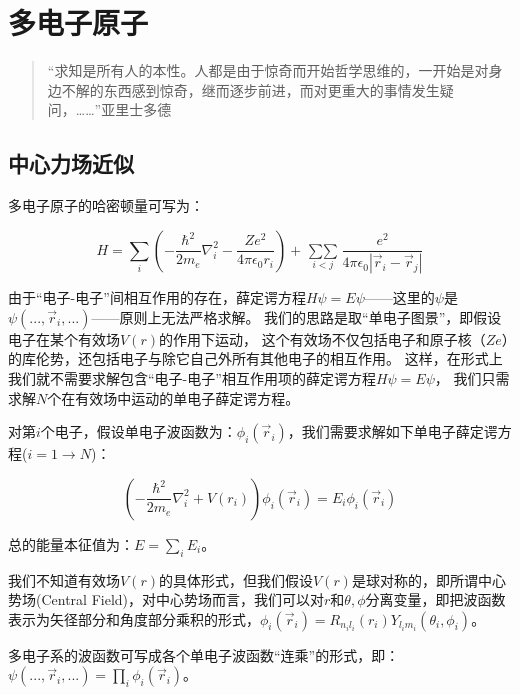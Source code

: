 \section{多电子原子}

\begin{quotation}
“求知是所有人的本性。人都是由于惊奇而开始哲学思维的，一开始是对身边不解的东西感到惊奇，继而逐步前进，而对更重大的事情发生疑问，……”\qquad 亚里士多德
\end{quotation}

\subsection{中心力场近似}

多电子原子的哈密顿量可写为：

\begin{equation}\label{Many electrons atom}
H = \sum\limits_i {\left( { - \frac{{\hbar ^2 }} {{2m_e }}\nabla
_i^2  - \frac{{Ze^2 }} {{4\pi \epsilon _0 r_i }}} \right) + \mathop
{\sum \sum }\limits_{i < j} \frac{{e^2 }} {{4\pi \epsilon _0 \left|
{\vec r_i  - \vec r_j } \right|}}}
\end{equation}


由于“电子-电子”间相互作用的存在，薛定谔方程$H\psi=E\psi$——这里的$\psi$是$\psi(...,\vec
r_i,...)$——原则上无法严格求解。
我们的思路是取“单电子图景”，即假设电子在某个有效场$V(r)$的作用下运动，
这个有效场不仅包括电子和原子核（$Ze$）的库伦势，还包括电子与除它自己外所有其他电子的相互作用。
这样，在形式上我们就不需要求解包含“电子-电子”相互作用项的薛定谔方程$H\psi=E\psi$，
我们只需求解$N$个在有效场中运动的单电子薛定谔方程。

对第$i$个电子，假设单电子波函数为：$\phi_i(\vec
r_i)$，我们需要求解如下单电子薛定谔方程($i = 1 \to N$)：

\begin{equation}\label{Effective SE}
    \left( -\frac{\hbar^2}{2m_e} \nabla_i^2 + V(r_i) \right)
    \phi_i(\vec r_i) = E_i \phi_i(\vec r_i)
\end{equation}

总的能量本征值为：$E=\sum \limits_i E_i$。



我们不知道有效场$V(r)$的具体形式，但我们假设$V(r)$是球对称的，即所谓中心势场(Central
Field)，对中心势场而言，我们可以对$r$和$\theta,
\phi$分离变量，即把波函数表示为矢径部分和角度部分乘积的形式，$\phi_i(\vec
r_i) = R_{n_i l_i} (r_i) Y_{l_i m_i}(\theta_i,\phi_i)$。

多电子系的波函数可写成各个单电子波函数“连乘”的形式，即：$\psi(...,\vec
r_i,...) = \prod \limits_i \phi_i(\vec r_i)$。

